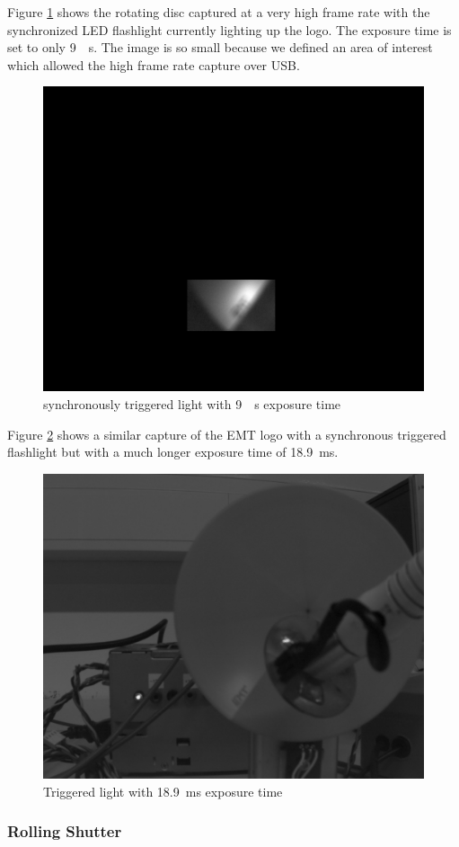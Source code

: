 \documentclass[
a4paper,     %
12pt         %
]{scrartcl}  %
\begin{document}
Figure \ref{fig:triggered_9us} shows the rotating disc captured at a very high frame rate with the synchronized LED flashlight currently lighting up the logo.
The exposure time is set to only \SI{9}{\mu s}.
The image is so small because we defined an area of interest which allowed the high frame rate capture over USB.

\begin{figure}[H]
 \centering
 \includegraphics[width=.6\linewidth]{./Bildg_Messtechnik_Lab/SensorDynamics/triggered_9us.png}
 \caption{synchronously triggered light with \SI{9}{\mu s} exposure time}
 \label{fig:triggered_9us}
\end{figure}

Figure \ref{fig:triggered_light_189ms_exp} shows a similar capture of the EMT logo with a synchronous triggered flashlight but with a much longer exposure time of \SI{18.9}{ms}.

\begin{figure}[H]
 \centering
 \includegraphics[width=.6\linewidth]{./Bildg_Messtechnik_Lab/SensorDynamics/triggered_light_18_9ms_exp.png}
 \caption{Triggered light with \SI{18.9}{ms} exposure time}
 \label{fig:triggered_light_189ms_exp}
\end{figure}

\subsubsection{Rolling Shutter}
\end{document}
